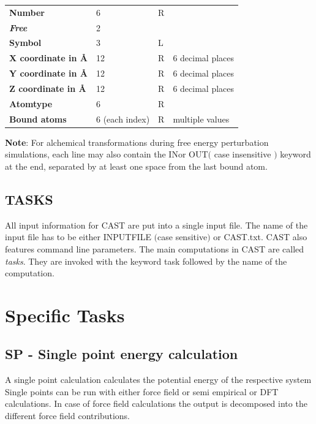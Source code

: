 \documentclass[10pt,a4paper]{article} %
\begin{document}
{\begin{tabularx}{\textwidth}{l|l|l|l}
		\textbf{Number}	& 6			& R	& ~\\
		\textbf{\textit{Free}}	& 2			&  ~ & ~\\
		\textbf{Symbol}	& 3			& L	& ~\\
		\textbf{X coordinate in Å}	& 12			& R & 6 decimal places\\
		\textbf{Y coordinate in Å}	& 12			 & R & 6 decimal places\\
		\textbf{Z coordinate in Å}	& 12			& R	& 6 decimal places\\
		\textbf{Atomtype}	& 6			& R	& ~\\
		\textbf{Bound atoms}	& 6 (each index)			& R	& multiple values\\
	\end{tabularx}

	\textbf{Note}: For alchemical transformations during free energy perturbation simulations, each line may also contain the \glqq IN\grqq or \glqq OUT\grqq $($ case insensitive $)$ keyword at the end, separated by at least one space from the last bound atom.
	\fi

	\subsection{TASKS}
	All input information for CAST are put into a single input file. The name of the input file has to be either INPUTFILE $($case sensitive$)$ or CAST.txt. CAST also features command line parameters. The main computations in CAST are called \textit{tasks}. They are invoked with the keyword task followed by the name of the computation.

	\newpage

	\section{Specific Tasks}

	\subsection{SP - Single point energy calculation}
	A single point calculation calculates the potential energy of the respective system Single points can be run with either force field or semi empirical or DFT calculations. In case of force field calculations the output is decomposed into the different force field contributions.\\

}
\end{document}
